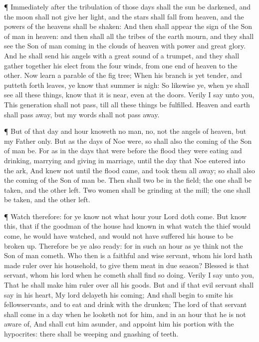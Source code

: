  ¶ Immediately after the tribulation of those days shall
the sun be darkened, and the moon shall not give her light, and the
stars shall fall from heaven, and the powers of the heavens shall be
shaken:  And then shall appear the sign of the Son of man
in heaven: and then shall all the tribes of the earth mourn, and they
shall see the Son of man coming in the clouds of heaven with power and
great glory.  And he shall send his angels with a great
sound of a trumpet, and they shall gather together his elect from the
four winds, from one end of heaven to the other.  Now learn
a parable of the fig tree; When his branch is yet tender, and putteth
forth leaves, ye know that summer is nigh:  So likewise ye,
when ye shall see all these things, know that it is near, even at the
doors.  Verily I say unto you, This generation shall not
pass, till all these things be fulfilled.  Heaven and earth
shall pass away, but my words shall not pass away.

 ¶ But of that day and hour knoweth no man, no, not the
angels of heaven, but my Father only.  But as the days of
Noe were, so shall also the coming of the Son of man be. 
For as in the days that were before the flood they were eating and
drinking, marrying and giving in marriage, until the day that Noe
entered into the ark,  And knew not until the flood came,
and took them all away; so shall also the coming of the Son of man be.
 Then shall two be in the field; the one shall be taken,
and the other left.  Two women shall be grinding at the
mill; the one shall be taken, and the other left.

 ¶ Watch therefore: for ye know not what hour your Lord
doth come.  But know this, that if the goodman of the house
had known in what watch the thief would come, he would have watched, and
would not have suffered his house to be broken up. 
Therefore be ye also ready: for in such an hour as ye think not the Son
of man cometh.  Who then is a faithful and wise servant,
whom his lord hath made ruler over his household, to give them meat in
due season?  Blessed is that servant, whom his lord when he
cometh shall find so doing.  Verily I say unto you, That he
shall make him ruler over all his goods.  But and if that
evil servant shall say in his heart, My lord delayeth his coming;
 And shall begin to smite his fellowservants, and to eat
and drink with the drunken;  The lord of that servant shall
come in a day when he looketh not for him, and in an hour that he is not
aware of,  And shall cut him asunder, and appoint him his
portion with the hypocrites: there shall be weeping and gnashing of
teeth.

